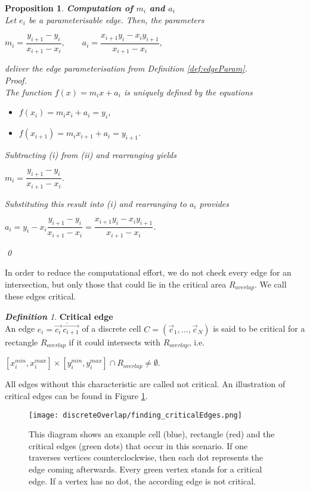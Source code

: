 \documentclass[a4paper,12pt,leqno]{article}
\theoremstyle{plain}
\newtheorem{proposition}[theorem]{Proposition}
\theoremstyle{remark}
\newtheorem{definition}[theorem]{\bf Definition}
\begin{document}
\begin{proposition}  \textbf{Computation of $m_i$ and $a_i$}\\
	Let $e_i$ be a parameterisable edge. Then, the parameters 
	\begin{center}
		$m_i = \dfrac{y_{i+1} - y_i}{x_{i+1} - x_i}, \qquad a_i = \dfrac{x_{i+1} y_i - x_i y_{i+1}}{x_{i+1} - x_i}$,
	\end{center}
	deliver the edge parameterisation from Definition \ref{def:edgeParam}. \\
	Proof. \\
	The function $f(x) = m_i x + a_i$ is uniquely defined by the equations	
	\begin{itemize}
		\item[(i)]  $f(x_i) = m_i x_i + a_i = y_i$, 
		\item[(ii)] $f(x_{i+1}) = m_i x_{i+1} + a_i = y_{i+1}$. 
	\end{itemize}
	Subtracting (i) from (ii) and rearranging yields
	\begin{center}
		$ m_i = \dfrac{y_{i+1} - y_i}{x_{i+1} - x_i} $. 
	\end{center}
	Substituting this result into (i) and rearranging to $a_i$ provides
	\begin{center}
		$ a_i = y_i - x_i \dfrac{y_{i+1} - y_i}{x_{i+1} - x_i} =\dfrac{x_{i+1} y_i - x_i y_{i+1}}{x_{i+1} - x_i} $.
	\end{center}
	\qed
\end{proposition}
In order to reduce the computational effort, we do not check every edge for an intersection, but only those that could lie in the critical area $R_{overlap}$. We call these edges critical. \\
\begin{definition} \textbf{Critical edge} \label{def:criticalEdge}\\
	An edge $e_i = \overline{ \vec{c_i} \: \vec{c_{i+1}} }$ of a discrete cell $C = (\vec{c}_1, \ldots, \vec{c}_N)$ is said to be critical for a rectangle $R_{overlap}$ if it could intersects with $R_{overlap}$, i.e. 
	\begin{center}
		$[x_{i}^{min}, x_{i}^{max}] \times [y_{i}^{min}, y_{i}^{max}] \cap R_{overlap} \neq \emptyset$.
	\end{center}
	All edges without this characteristic are called not critical. An illustration of critical edges can be found in Figure \ref{fig:criticalEdges}. \\
\end{definition}
\begin{figure}
	\centering
	\texttt{[image: discreteOverlap/finding\_criticalEdges.png]}
	\caption{This diagram shows an example cell (blue), rectangle (red) and the critical edges (green dots) that occur in this scenario. If one traverses vertices counterclockwise, then each dot represents the edge coming afterwards. Every green vertex stands for a critical edge. If a vertex has no dot, the according edge is not critical.}
	\label{fig:criticalEdges}
\end{figure}
\end{document}
